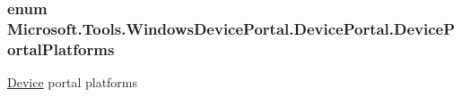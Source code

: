 \subsubsection[{\texorpdfstring{Device\+Portal\+Platforms}{DevicePortalPlatforms}}]{\setlength{\rightskip}{0pt plus 5cm}enum {\bf Microsoft.\+Tools.\+Windows\+Device\+Portal.\+Device\+Portal.\+Device\+Portal\+Platforms}\hspace{0.3cm}{\ttfamily [strong]}}\hypertarget{class_microsoft_1_1_tools_1_1_windows_device_portal_1_1_device_portal_a48a281d856cdc961d5319286d452c9b5}{}\label{class_microsoft_1_1_tools_1_1_windows_device_portal_1_1_device_portal_a48a281d856cdc961d5319286d452c9b5}


\hyperlink{class_microsoft_1_1_tools_1_1_windows_device_portal_1_1_device_portal_1_1_device}{Device} portal platforms 

